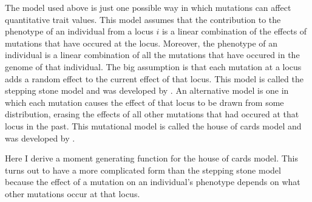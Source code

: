 The model used above is just one possible way in which mutations can affect
quantitative trait values. This model assumes that the contribution to the
phenotype of an individual from a locus $i$ is a linear combination of the
effects of mutations that have occured at the locus. Moreover, the phenotype of
an individual is a linear combination of all the mutations that have occured in
the genome of that individual. The big assumption is that each mutation at a
locus adds a random effect to the current effect of that locus. This model is
called the stepping stone model and was developed by \citet{Kimura1965}. An
alternative model is one in which each mutation causes the effect of that locus
to be drawn from some distribution, erasing the effects of all other mutations
that had occured at that locus in the past. This mutational model is called the
house of cards model and was developed by \citet{Kingman1978}. 

Here I derive a moment generating function for the house of cards model. This
turns out to have a more complicated form than the stepping stone model because
the effect of a mutation on an individual's phenotype depends on what other
mutations occur at that locus.

